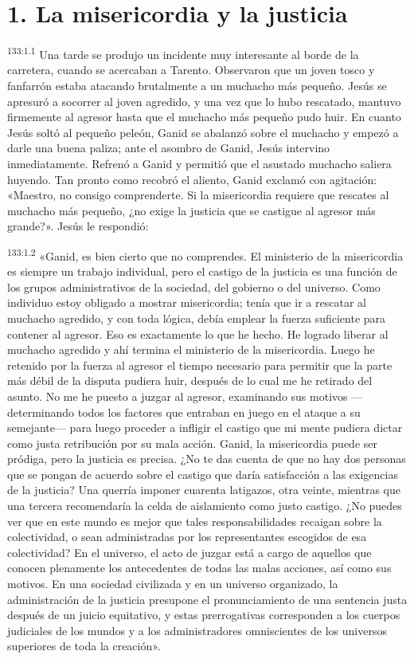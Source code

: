 \section*{1. La misericordia y la justicia}
\par 
\textsuperscript{133:1.1} Una tarde se produjo un incidente muy interesante al borde de la carretera, cuando se acercaban a Tarento. Observaron que un joven tosco y fanfarrón estaba atacando brutalmente a un muchacho más pequeño. Jesús se apresuró a socorrer al joven agredido, y una vez que lo hubo rescatado, mantuvo firmemente al agresor hasta que el muchacho más pequeño pudo huir. En cuanto Jesús soltó al pequeño peleón, Ganid se abalanzó sobre el muchacho y empezó a darle una buena paliza; ante el asombro de Ganid, Jesús intervino inmediatamente. Refrenó a Ganid y permitió que el asustado muchacho saliera huyendo. Tan pronto como recobró el aliento, Ganid exclamó con agitación: «Maestro, no consigo comprenderte. Si la misericordia requiere que rescates al muchacho más pequeño, ¿no exige la justicia que se castigue al agresor más grande?». Jesús le respondió:

\par 
\textsuperscript{133:1.2} «Ganid, es bien cierto que no comprendes. El ministerio de la misericordia es siempre un trabajo individual, pero el castigo de la justicia es una función de los grupos administrativos de la sociedad, del gobierno o del universo. Como individuo estoy obligado a mostrar misericordia; tenía que ir a rescatar al muchacho agredido, y con toda lógica, debía emplear la fuerza suficiente para contener al agresor. Eso es exactamente lo que he hecho. He logrado liberar al muchacho agredido y ahí termina el ministerio de la misericordia. Luego he retenido por la fuerza al agresor el tiempo necesario para permitir que la parte más débil de la disputa pudiera huir, después de lo cual me he retirado del asunto. No me he puesto a juzgar al agresor, examinando sus motivos ---determinando todos los factores que entraban en juego en el ataque a su semejante--- para luego proceder a infligir el castigo que mi mente pudiera dictar como justa retribución por su mala acción. Ganid, la misericordia puede ser pródiga, pero la justicia es precisa. ¿No te das cuenta de que no hay dos personas que se pongan de acuerdo sobre el castigo que daría satisfacción a las exigencias de la justicia? Una querría imponer cuarenta latigazos, otra veinte, mientras que una tercera recomendaría la celda de aislamiento como justo castigo. ¿No puedes ver que en este mundo es mejor que tales responsabilidades recaigan sobre la colectividad, o sean administradas por los representantes escogidos de esa colectividad? En el universo, el acto de juzgar está a cargo de aquellos que conocen plenamente los antecedentes de todas las malas acciones, así como sus motivos. En una sociedad civilizada y en un universo organizado, la administración de la justicia presupone el pronunciamiento de una sentencia justa después de un juicio equitativo, y estas prerrogativas corresponden a los cuerpos judiciales de los mundos y a los administradores omniscientes de los universos superiores de toda la creación».

